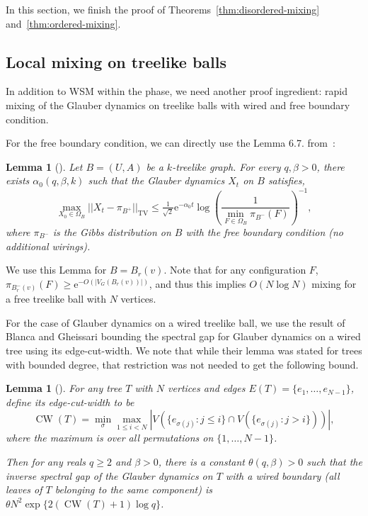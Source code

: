 \documentclass[11pt]{article}
\theoremstyle{plain}
\newtheorem{lemma}[theorem]{Lemma}
\newcommand{\emm}{\mathrm{e}}
\newcommand{\TV}{\mathrm{TV}}
\newcommand{\1}{\mathbb{1}}
\DeclareMathOperator{\CW}{CW}
\begin{document}
In this section, we finish the proof of Theorems~\ref{thm:disordered-mixing} and~\ref{thm:ordered-mixing}.

\subsection{Local mixing on treelike balls}\label{sec:tree-mixing}

In addition to WSM within the phase, we need another proof ingredient: rapid mixing of the Glauber dynamics on treelike balls with wired and free boundary condition.

For the free boundary condition, we can directly use the Lemma 6.7. from~\cite{rcm-on-unbounded-degree-graphs}:

\begin{lemma}[{\cite[Lemma 6.7]{rcm-on-unbounded-degree-graphs}}]
    Let \(B = (U,A)\) be a \(k\)-treelike graph. For every \(q,\beta > 0\), there exists \(\alpha_0(q,\beta,k)\) such that the Glauber dynamics \(X_t\) on \(B\) satisfies,
    \[
    \max_{X_0\in\Omega_{B}} || X_t - \pi_{B^+} ||_\TV \leq \tfrac{1}{\sqrt 2} \emm^{-\alpha_0 t} \log\left(\frac{1}{\min_{F\in\Omega_B} \pi_{B^-}(F)}\right)^{-1},
    \]
    where \(\pi_{B^-}\) is the Gibbs distribution on \(B\) with the free boundary condition (no additional wirings).
\end{lemma}

We use this Lemma for \(B = B_r(v)\). Note that for any configuration \(F\), \(\pi_{B_r^-(v)}(F)\geq \emm^{-O(|V_G(B_r(v))|)}\), and thus this implies \(O(N\log N)\) mixing for a free treelike ball with \(N\) vertices.

For the case of Glauber dynamics on a wired treelike ball, we use the result of Blanca and Gheissari \cite{BlaGhe} bounding the spectral gap for Glauber dynamics on a wired tree using its edge-cut-width. We note that while their lemma was stated for trees with bounded degree, that restriction was not needed to get the following bound.

\begin{lemma}[{\cite[Lemma 5.10]{BlaGhe}}]
    For any tree \(T\) with \(N\) vertices and edges \(E(T) = \{e_1,\dots,e_{N-1}\}\), define its \emph{edge-cut-width} to be
    \[
    \CW(T) = \min_{\sigma}\max_{1\leq i < N} |V(\{e_{\sigma(j)} : j\leq i\}\cap V(\{e_{\sigma(j)} : j > i\}))|,
    \]
    where the maximum is over all permutations on \(\{1,\dots,N-1\}\).

    Then for any reals \(q\geq 2\) and \(\beta > 0\), there is a constant \(\theta(q,\beta) > 0\) such that the inverse spectral gap of the Glauber dynamics on \(T\) with a \emph{wired boundary} (all leaves of \(T\) belonging to the same component) is \(\theta N^2 \exp\{2(\CW(T)+1)\log q\}\).
\end{lemma}
\end{document}
